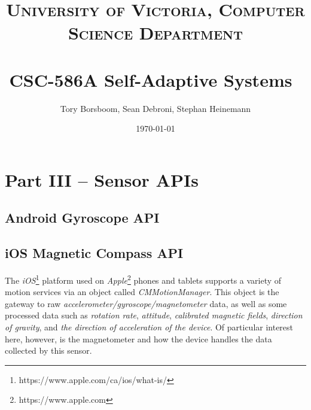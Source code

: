 \documentclass[paper=letter, fontsize=11pt]{scrartcl}
\title{	
\normalfont \normalsize 
\textsc{University of Victoria, Computer Science Department} \\ [25pt]
\horrule{0.5pt} \\[0.4cm]
\huge CSC-586A Self-Adaptive Systems\
\horrule{2pt} \\[0.5cm]
}
\author{Tory Borsboom, Sean Debroni, Stephan Heinemann}
\date{\normalsize\today}
\numberwithin{equation}{section}
\numberwithin{figure}{section}
\numberwithin{table}{section}
\begin{document}
\maketitle 

\section{Part III -- Sensor APIs}
\label{part3}

\subsection{Android Gyroscope API}
\label{android_gyroscope_api}
\par



\subsection{iOS Magnetic Compass API}
\label{ios_compass_api}
\par
The {\em iOS}\footnote{https://www.apple.com/ca/ios/what-is/} platform used on
{\em Apple}\footnote{https://www.apple.com} phones and tablets supports a
variety of motion services via an object called {\em CMMotionManager}. This
object is the gateway to raw {\em accelerometer/gyroscope/magnetometer} data, as
well as some processed data such as {\em rotation rate}, {\em attitude},
{\em calibrated magnetic fields}, {\em direction of gravity}, and {\em the
direction of acceleration of the device}.
Of particular interest here, however, is the magnetometer and how the device
handles the data collected by this sensor.
\end{document}

